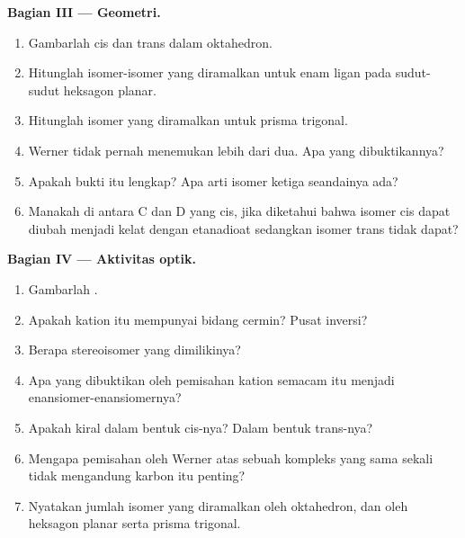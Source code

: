 \begin{problem}
\medskip
\noindent\textbf{Bagian III --- Geometri.}
\begin{enumerate}[resume]
  \item Gambarlah \ce{[CoCl2(NH3)4]+} cis dan trans dalam oktahedron.
  \item Hitunglah isomer-isomer \ce{[CoCl2(NH3)4]+} yang diramalkan untuk
        enam ligan pada sudut-sudut heksagon planar.
  \item Hitunglah isomer yang diramalkan untuk prisma trigonal.
  \item Werner tidak pernah menemukan lebih dari dua. Apa yang dibuktikannya?
  \item Apakah bukti itu lengkap? Apa arti isomer ketiga seandainya ada?
  \item Manakah di antara C dan D yang cis, jika diketahui bahwa isomer cis
        dapat diubah menjadi kelat dengan etanadioat sedangkan isomer trans
        tidak dapat?
\end{enumerate}

\medskip
\noindent\textbf{Bagian IV --- Aktivitas optik.}
\begin{enumerate}[resume]
  \item Gambarlah .
  \item Apakah kation itu mempunyai bidang cermin? Pusat inversi?
  \item Berapa stereoisomer yang dimilikinya?
  \item Apa yang dibuktikan oleh pemisahan kation semacam itu menjadi
        enansiomer-enansiomernya?
  \item Apakah \ce{[CoCl2(en)2]+} kiral dalam bentuk cis-nya? Dalam bentuk
        trans-nya?
  \item Mengapa pemisahan oleh Werner atas sebuah kompleks yang sama sekali
        tidak mengandung karbon itu penting?
  \item Nyatakan jumlah isomer \ce{[CoCl2(NH3)4]+} yang diramalkan oleh
        oktahedron, dan oleh heksagon planar serta prisma trigonal.
\end{enumerate}
\end{problem}
